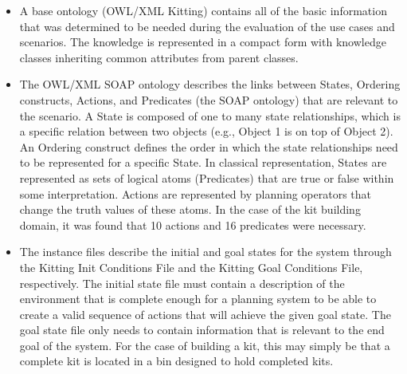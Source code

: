\begin{itemize}
\item A base ontology (\textsf{OWL/XML Kitting})
contains all of the basic information that was determined to be needed
during the evaluation of the use cases and scenarios. The knowledge is
represented in a compact form with knowledge classes
inheriting common attributes from parent classes. 
\item The \textsf{OWL/XML SOAP} ontology describes the links between States, Ordering constructs, Actions, and Predicates (the SOAP
ontology) that are relevant to the scenario. A State is composed of one to many state relationships, which is
a specific relation between two objects (e.g., Object 1 is on top of Object 2). An Ordering construct defines the order in which the state relationships need to be 
represented for a specific State. In classical representation, States are represented as sets of logical
atoms (Predicates) that are true or false within some interpretation. Actions are represented by
planning operators that change the truth values of these atoms. In the case of the kit building domain, it was found that 10 actions and
16 predicates were necessary.

\item The instance files describe the initial and goal states for the
system through the \textsf{Kitting Init Conditions File} and the
\textsf{Kitting Goal Conditions File}, respectively. The initial state file
must contain a description of the environment that is complete enough for a
planning system to be able to create a valid sequence of actions that will
achieve the given goal state. The goal state file only needs to contain
information that is relevant to the end goal of the system. For the case of building a kit, this may simply be that a complete kit is located in a bin designed to hold completed kits.

\end{itemize}







